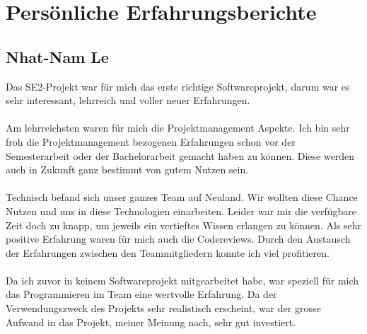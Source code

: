\chapter{Persönliche Erfahrungsberichte}
	\section{Nhat-Nam Le}
	Das SE2-Projekt war für mich das erste richtige Softwareprojekt, darum war es sehr interessant, lehrreich und voller neuer Erfahrungen. \\ \\
Am lehrreichsten waren für mich die Projektmanagement Aspekte. Ich bin sehr froh die Projektmanagement bezogenen Erfahrungen schon vor der Semesterarbeit oder der Bachelorarbeit gemacht haben zu können. Diese werden auch in Zukunft ganz bestimmt von gutem Nutzen sein.\\ \\
Technisch befand sich unser ganzes Team auf Neuland. Wir wollten diese Chance Nutzen und uns in diese Technologien einarbeiten. Leider war mir die verfügbare Zeit doch zu knapp, um jeweils ein vertieftes Wissen erlangen zu können. Als sehr positive Erfahrung waren für mich auch die Codereviews. Durch den Austausch der Erfahrungen zwischen den Teammitgliedern konnte ich viel profitieren.\\ \\
Da ich zuvor in keinem Softwareprojekt mitgearbeitet habe, war speziell für mich das Programmieren im Team eine wertvolle Erfahrung. Da der Verwendungszweck des Projekts sehr realistisch erscheint, war der grosse Aufwand in das Projekt, meiner Meinung nach, sehr gut investiert.

	
